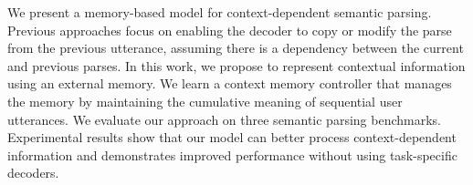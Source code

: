 We present a memory-based model for context-dependent semantic parsing. Previous approaches focus on enabling the decoder to copy or modify the parse from the previous utterance, assuming there is a dependency between the current and previous parses. In this work, we propose to represent contextual information using an external memory. We learn a context memory controller that manages the memory by maintaining the cumulative meaning of sequential user utterances. We evaluate our approach on three semantic parsing benchmarks. Experimental results show that our model can better process context-dependent information and demonstrates improved performance without using task-specific decoders.